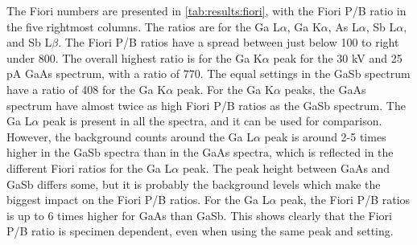 The Fiori numbers are presented in \cref{tab:results:fiori}, with the Fiori P/B ratio in the five rightmost columns.
The ratios are for the Ga L$\alpha$, Ga K$\alpha$, As L$\alpha$, Sb L$\alpha$, and Sb L$\beta$.
The Fiori P/B ratios have a spread between just below 100 to right under 800.
The overall highest ratio is for the Ga K$\alpha$ peak for the 30 kV and 25 pA GaAs spectrum, with a ratio of 770.
The equal settings in the GaSb spectrum have a ratio of 408 for the Ga K$\alpha$ peak.
For the Ga K$\alpha$ peaks, the GaAs spectrum have almost twice as high Fiori P/B ratios as the GaSb spectrum.
The Ga L$\alpha$ peak is present in all the spectra, and it can be used for comparison.
However, the background counts around the Ga L$\alpha$ peak is around 2-5 times higher in the GaSb spectra than in the GaAs spectra, which is reflected in the different Fiori ratios for the Ga L$\alpha$ peak.
The peak height between GaAs and GaSb differs some, but it is probably the background levels which make the biggest impact on the Fiori P/B ratios.
For the Ga L$\alpha$ peak, the Fiori P/B ratios is up to 6 times higher for GaAs than GaSb.
This shows clearly that the Fiori P/B ratio is specimen dependent, even when using the same peak and setting.


